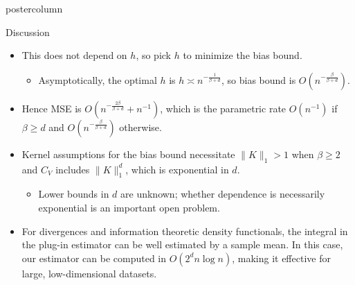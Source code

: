 \documentclass[final,hyperref={pdfpagelabels=false}]{beamer}
\newcommand{\inv}{^{-1}}
\begin{document}
\begin{frame}
\begin{columns}
\begin{column}{.32\textwidth}
\begin{beamercolorbox}[center,wd=\textwidth]{postercolumn}
\begin{minipage}[T]{.95\textwidth}
{\begin{block}{Discussion}
\begin{itemize}
                        the variance of the estimator:
                        \vspace{-5mm}
                        \[\mathbb{V}[F(\hat p_1,\dots,\hat p_k)]
                                                    \leq C_V^2n\inv.\]
                  \item This does not depend on $h$, so pick $h$ to minimize
                        the bias bound.
                        \begin{itemize}
                        \item Asymptotically, the optimal $h$ is
                              $h \asymp n^{-\frac{1}{\beta + d}}$, so bias
                              bound is
                              $O\left( n^{-\frac{\beta}{\beta + d}} \right)$.
                        \end{itemize}
                  \item Hence MSE is $O(n^{-\frac{2\beta}{\beta + d}}+n\inv)$,
                        which is the parametric rate $O(n\inv)$ if
                        $\beta \geq d$ and $O(n^{-\frac{\beta}{\beta + d}})$
                        otherwise.
                  \item Kernel assumptions for the bias bound necessitate
                        $\|K\|_1 > 1$ when $\beta \geq 2$ and $C_V$ includes
                        $\|K\|_1^d$, which is exponential in $d$.
                        \begin{itemize}
                        \item Lower bounds in $d$ are unknown; whether
                        dependence is necessarily exponential is an important
                        open problem.
                        \end{itemize}
                  \item For divergences and information theoretic density
                        functionals, the integral in the plug-in estimator can
                        be well estimated by a sample mean. In this case, our
                        estimator can be computed in $O(2^d n \log n)$, making
                        it effective for large, low-dimensional datasets.
                  \end{itemize}
            \end{block}
}
\end{minipage}
\end{beamercolorbox}
\end{column}
\end{columns}
\end{frame}
\end{document}
